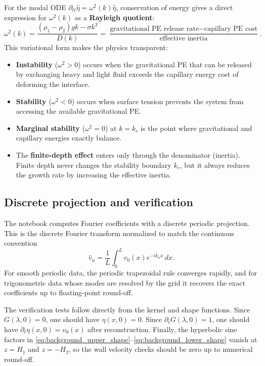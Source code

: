 \documentclass[11pt,a4paper]{article}
\begin{document}
For the modal ODE $\partial_{tt}\widehat{\eta}=\omega^2(k)\widehat{\eta}$, conservation of energy gives a direct expression for $\omega^2(k)$ as a \textbf{Rayleigh quotient}:
\begin{equation}
    \boxed{
    \omega^2(k)
    =
    \frac{(\rho_1-\rho_2)gk - \sigma k^3}{D(k)}
    =
    \frac{\text{gravitational PE release rate} - \text{capillary PE cost}}{\text{effective inertia}}.
    }
    \label{eq:rayleigh_quotient}
\end{equation}
This variational form makes the physics transparent:
\begin{itemize}[leftmargin=*]
    \item \textbf{Instability} ($\omega^2>0$) occurs when the gravitational PE that can be released by exchanging heavy and light fluid exceeds the capillary energy cost of deforming the interface.
    \item \textbf{Stability} ($\omega^2<0$) occurs when surface tension prevents the system from accessing the available gravitational PE.
    \item \textbf{Marginal stability} ($\omega^2=0$) at $k=k_c$ is the point where gravitational and capillary energies exactly balance.
    \item The \textbf{finite-depth effect} enters only through the denominator (inertia).  Finite depth never changes the stability boundary $k_c$, but it always reduces the growth rate by increasing the effective inertia.
\end{itemize}

\subsection{Discrete projection and verification}

The notebook computes Fourier coefficients with a discrete periodic projection.  This is the discrete Fourier transform normalized to match the continuous convention
\begin{equation}
    \widehat{v}_n
    =
    \frac{1}{L}\int_0^L v_0(x)e^{-ik_nx}\,dx.
\end{equation}
For smooth periodic data, the periodic trapezoidal rule converges rapidly, and for trigonometric data whose modes are resolved by the grid it recovers the exact coefficients up to floating-point round-off.

The verification tests follow directly from the kernel and shape functions.  Since $G(\lambda,0)=0$, one should have $\eta(x,0)=0$.  Since $\partial_tG(\lambda,0)=1$, one should have $\partial_t\eta(x,0)=v_0(x)$ after reconstruction.  Finally, the hyperbolic sine factors in \eqref{eq:background_upper_shape}--\eqref{eq:background_lower_shape} vanish at $z=H_1$ and $z=-H_2$, so the wall velocity checks should be zero up to numerical round-off.
\end{document}
